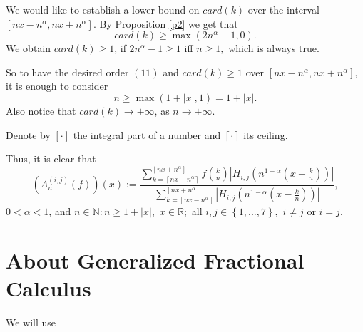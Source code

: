 \documentclass[10pt]{NSP1}
\numberwithin{equation}{section}
\begin{document}
\begin{note}
\label{n3}We would like to establish a lower bound on $card\left( k\right) $
over the interval $\left[ nx-n^{\alpha },nx+n^{\alpha }\right] $. By
Proposition \ref{p2} we get that
\begin{equation*}
card\left( k\right) \geq \max \left( 2n^{\alpha }-1,0\right) .
\end{equation*}
We obtain $card\left( k\right) \geq 1$, if $2n^{\alpha }-1\geq 1$ iff $n\geq
1,$ which is always true.

So to have the desired order $\left( 11\right) $ and $card\left( k\right)
\geq 1$ over $\left[ nx-n^{\alpha },nx+n^{\alpha }\right] ,$ it is enough to
consider
\begin{equation}
n\geq \max \left( 1+\left \vert x\right \vert ,1\right) =1+\left \vert
x\right \vert .  \tag{13}  \label{13.}
\end{equation}
Also notice that $card\left( k\right) \rightarrow +\infty $, as $%
n\rightarrow +\infty .$
\end{note}

Denote by $\left[ \cdot \right] $ the integral part of a number and $%
\left
\lceil \cdot \right \rceil $ its ceiling.

Thus, it is clear that
\begin{equation}
\left( A_{n}^{\left( i,j\right) }\left( f\right) \right) \left( x\right) :=%
\frac{\sum \limits_{k=\left \lceil nx-n^{\alpha }\right \rceil }^{\left[
nx+n^{\alpha }\right] }f\left( \frac{k}{n}\right) \left \vert H_{i,j}\left(
n^{1-\alpha }\left( x-\frac{k}{n}\right) \right) \right \vert }{\sum
\limits_{k=\left \lceil nx-n^{\alpha }\right \rceil }^{\left[ nx+n^{\alpha }%
\right] }\left \vert H_{i,j}\left( n^{1-\alpha }\left( x-\frac{k}{n}\right)
\right) \right \vert },  \tag{14}  \label{14.}
\end{equation}
$0<\alpha <1$, and $n\in \mathbb{N}:n\geq 1+\left \vert x\right \vert ,$ $%
x\in \mathbb{R};$ all $i,j\in \left \{ 1,...,7\right \} ,$ $i\neq j$ or $%
i=j. $

\section{\; About Generalized Fractional Calculus}

We will use
\end{document}
